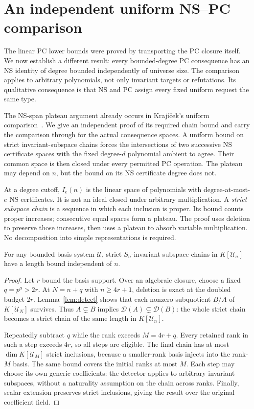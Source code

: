 \section{An independent uniform NS--PC comparison}\label{sec:comparison}
The linear PC lower bounds were proved by transporting the PC closure
itself. We now establish a different result: every bounded-degree PC
consequence has an NS identity of degree bounded independently of
universe size. The comparison applies to arbitrary polynomials, not
only invariant targets or refutations. Its qualitative consequence is
that NS and PC assign every fixed uniform request the same type.

The NS-span plateau argument already occurs in Kraj\'i\v cek's
uniform comparison~\cite[Theorem~5.5]{Krajicek}. We give an independent
proof of its required chain bound and carry the comparison through for
the actual consequence spaces. A uniform bound on strict
invariant-subspace chains forces the intersections of two successive
NS certificate spaces with the fixed degree-$d$ polynomial ambient
to agree. Their common
space is then closed under every permitted PC operation. The plateau
may depend on $n$, but the bound on its NS certificate degree does not.

At a degree cutoff, $I_e(n)$ is the linear space of polynomials with
degree-at-most-$e$ NS certificates. It is not an ideal closed under
arbitrary multiplication.
A \emph{strict subspace chain} is a sequence in which each inclusion
is proper. Its bound counts proper increases; consecutive equal
spaces form a plateau. The proof uses deletion to preserve those
increases, then uses a plateau to absorb variable multiplication.
No decomposition into simple representations is required.

\begin{lemma}\label{lem:chains}
For any bounded basis system $\mathcal U$, strict $S_n$-invariant
subspace chains in $K[\mathcal U_n]$ have a length bound independent of $n$.
\end{lemma}
\begin{proof}
Let $r$ bound the basis support. Over an algebraic closure, choose a
fixed $q=p^a>2r$. At $N=n+q$ with $n\ge4r+1$, deletion is exact at the
doubled budget $2r$. Lemma~\ref{lem:detect} shows that each nonzero
subquotient $B/A$ of $K[\mathcal U_N]$ survives. Thus
$A\subsetneq B$ implies
$\mathcal D(A)\subsetneq\mathcal D(B)$: the whole strict chain becomes
a strict chain of the same length in $K[\mathcal U_n]$.

Repeatedly subtract $q$ while the rank exceeds $M=4r+q$. Every retained
rank in such a step exceeds $4r$, so all steps are eligible. The final
chain has at most $\dim K[\mathcal U_M]$ strict inclusions, because a
smaller-rank basis injects into the rank-$M$ basis. The same bound covers
the initial ranks at most $M$. Each step may choose its own generic
coefficients: the detector applies to arbitrary invariant subspaces,
without a naturality assumption on the chain across ranks. Finally,
scalar extension preserves strict inclusions, giving the result over
the original coefficient field.
\end{proof}

